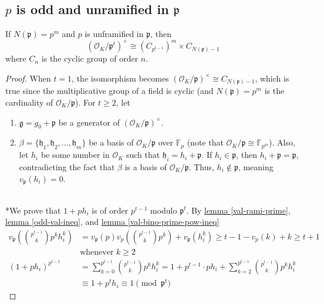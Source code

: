 \documentclass{treatise}
\begin{document}
\subsection{$p$ is odd and unramified in $\mathfrak{p}$}
\begin{theorem}
If $N(\mathfrak{p}) = p^m$ and $p$ is unframified in $\mathfrak{p}$, then
$$(\mathcal{O}_K / \mathfrak{p}^t)^\times \cong (C_{p^{t - 1}})^m \times C_{N(\mathfrak{p}) - 1}$$
where $C_n$ is the cyclic group of order $n$.
\end{theorem}
\begin{proof}
When $t = 1$, the isomorphism becomes $(\mathcal{O}_K / \mathfrak{p})^\times \cong C_{N(\mathfrak{p}) - 1}$, which is true since the multiplicative group of a field is cyclic (and $N(\mathfrak{p}) = p^m$ is the cardinality of $\mathcal{O}_K / \mathfrak{p}$). For $t \geq 2$, let
\begin{enumerate}
	\item $\mathfrak{g} = g_0 + \mathfrak{p}$ be a generator of $(\mathcal{O}_K / \mathfrak{p})^\times$.
	\item $\beta = \{ \mathfrak{h}_1, \mathfrak{h}_2, \hdots, \mathfrak{h}_m \}$ be a basis of $\mathcal{O}_K / \mathfrak{p}$ over $\mathbb{F}_p$ (note that $\mathcal{O}_K / \mathfrak{p} \cong \mathbb{F}_{p^m}$). Also, let $h_i$ be some number in $\mathcal{O}_K$ such that $\mathfrak{h}_i = h_i + \mathfrak{p}$. If $h_i \in \mathfrak{p}$, then $h_i + \mathfrak{p} = \mathfrak{p}$, contradicting the fact that $\beta$ is a basis of $\mathcal{O}_K / \mathfrak{p}$. Thus, $h_i \notin \mathfrak{p}$, meaning $v_\mathfrak{p} (h_i) = 0$.
\end{enumerate}
\ \\
*We prove that $1 + p h_i$ is of order $p^{t - 1}$ modulo $\mathfrak{p}^t$. By \hyperref[val-rami-prime]{lemma \ref*{val-rami-prime}}, \hyperref[odd-val-ineq]{lemma \ref*{odd-val-ineq}}, and \hyperref[val-bino-prime-pow-ineq]{lemma \ref*{val-bino-prime-pow-ineq}}
\begin{align*}
v_\mathfrak{p} \left( {p^{t - 1} \choose k} p^k h_i^k \right) & = v_\mathfrak{p}(p) v_p \left( {p^{t - 1} \choose k} p^k \right) + v_\mathfrak{p} (h_i^k) \geq t - 1 - v_p (k) + k \geq t + 1 \\
& \mbox{whenever } k \geq 2 \\
(1 + p h_i)^{p^{t - 1}} & = \sum_{k = 0}^{p^{t - 1}} {p^{t - 1} \choose k} p^k h_i^k = 1 + p^{t - 1} \cdot p h_i + \sum_{k = 2}^{p^{t - 1}} {p^{t - 1} \choose k} p^k h_i^k \\
& \equiv 1 + p^t h_i \equiv 1 \pmod{\mathfrak{p}^t}

\end{align*}
\end{proof}
\end{document}
